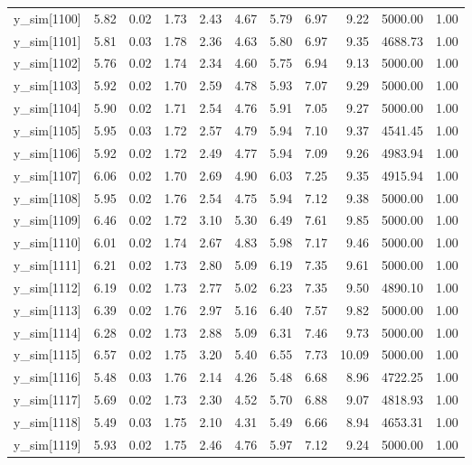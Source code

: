 \begin{table}[ht]
\begin{tabular}{rrrrrrrrrrr}
  y\_sim[1100] & 5.82 & 0.02 & 1.73 & 2.43 & 4.67 & 5.79 & 6.97 & 9.22 & 5000.00 & 1.00 \\ 
  y\_sim[1101] & 5.81 & 0.03 & 1.78 & 2.36 & 4.63 & 5.80 & 6.97 & 9.35 & 4688.73 & 1.00 \\ 
  y\_sim[1102] & 5.76 & 0.02 & 1.74 & 2.34 & 4.60 & 5.75 & 6.94 & 9.13 & 5000.00 & 1.00 \\ 
  y\_sim[1103] & 5.92 & 0.02 & 1.70 & 2.59 & 4.78 & 5.93 & 7.07 & 9.29 & 5000.00 & 1.00 \\ 
  y\_sim[1104] & 5.90 & 0.02 & 1.71 & 2.54 & 4.76 & 5.91 & 7.05 & 9.27 & 5000.00 & 1.00 \\ 
  y\_sim[1105] & 5.95 & 0.03 & 1.72 & 2.57 & 4.79 & 5.94 & 7.10 & 9.37 & 4541.45 & 1.00 \\ 
  y\_sim[1106] & 5.92 & 0.02 & 1.72 & 2.49 & 4.77 & 5.94 & 7.09 & 9.26 & 4983.94 & 1.00 \\ 
  y\_sim[1107] & 6.06 & 0.02 & 1.70 & 2.69 & 4.90 & 6.03 & 7.25 & 9.35 & 4915.94 & 1.00 \\ 
  y\_sim[1108] & 5.95 & 0.02 & 1.76 & 2.54 & 4.75 & 5.94 & 7.12 & 9.38 & 5000.00 & 1.00 \\ 
  y\_sim[1109] & 6.46 & 0.02 & 1.72 & 3.10 & 5.30 & 6.49 & 7.61 & 9.85 & 5000.00 & 1.00 \\ 
  y\_sim[1110] & 6.01 & 0.02 & 1.74 & 2.67 & 4.83 & 5.98 & 7.17 & 9.46 & 5000.00 & 1.00 \\ 
  y\_sim[1111] & 6.21 & 0.02 & 1.73 & 2.80 & 5.09 & 6.19 & 7.35 & 9.61 & 5000.00 & 1.00 \\ 
  y\_sim[1112] & 6.19 & 0.02 & 1.73 & 2.77 & 5.02 & 6.23 & 7.35 & 9.50 & 4890.10 & 1.00 \\ 
  y\_sim[1113] & 6.39 & 0.02 & 1.76 & 2.97 & 5.16 & 6.40 & 7.57 & 9.82 & 5000.00 & 1.00 \\ 
  y\_sim[1114] & 6.28 & 0.02 & 1.73 & 2.88 & 5.09 & 6.31 & 7.46 & 9.73 & 5000.00 & 1.00 \\ 
  y\_sim[1115] & 6.57 & 0.02 & 1.75 & 3.20 & 5.40 & 6.55 & 7.73 & 10.09 & 5000.00 & 1.00 \\ 
  y\_sim[1116] & 5.48 & 0.03 & 1.76 & 2.14 & 4.26 & 5.48 & 6.68 & 8.96 & 4722.25 & 1.00 \\ 
  y\_sim[1117] & 5.69 & 0.02 & 1.73 & 2.30 & 4.52 & 5.70 & 6.88 & 9.07 & 4818.93 & 1.00 \\ 
  y\_sim[1118] & 5.49 & 0.03 & 1.75 & 2.10 & 4.31 & 5.49 & 6.66 & 8.94 & 4653.31 & 1.00 \\ 
  y\_sim[1119] & 5.93 & 0.02 & 1.75 & 2.46 & 4.76 & 5.97 & 7.12 & 9.24 & 5000.00 & 1.00 \\ 

\end{tabular}
\end{table}

